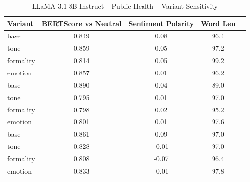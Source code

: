 \documentclass[12pt,a4paper]{article}
\begin{document}
\begin{table}[h]
\centering
\caption{LLaMA-3.1-8B-Instruct – Public Health – Variant Sensitivity}
\label{tab:LLaMA-3.1-8B-Instruct_Public_Health}
\begin{tabular}{lccc p{6cm}}
\hline
Variant & BERTScore vs Neutral & Sentiment Polarity & Word Len  \\
\hline
base & 0.849 & 0.08 & 96.4  \\
tone & 0.859 & 0.05 & 97.2  \\
formality & 0.814 & 0.05 & 99.2  \\
emotion & 0.857 & 0.01 & 96.2  \\
base & 0.890 & 0.04 & 89.0  \\
tone & 0.795 & 0.01 & 97.0  \\
formality & 0.798 & 0.02 & 95.2  \\
emotion & 0.801 & 0.01 & 97.6  \\
base & 0.861 & 0.09 & 97.0  \\
tone & 0.828 & -0.01 & 97.0  \\
formality & 0.808 & -0.07 & 96.4  \\
emotion & 0.833 & -0.01 & 97.8  \\
\hline
\end{tabular}
\end{table}
\end{document}

